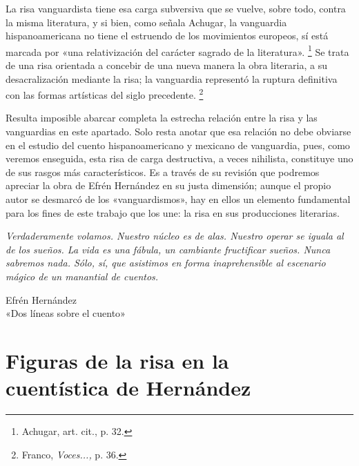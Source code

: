 \documentclass[14pt,twoside,final]{extbook} %
\let\oldfootnote\footnote
\renewcommand\footnote[1]{%
\oldfootnote{\hspace{1mm}#1}}
\begin{document}
La risa vanguardista tiene esa carga subversiva que se vuelve, sobre todo, contra la misma literatura, y si bien, como señala Achugar, la vanguardia hispanoamericana no tiene el estruendo de los movimientos europeos, sí está marcada por «una relativización del carácter sagrado de la literatura».\footnote{Achugar, art. cit., p. 32.} Se trata de una risa orientada a concebir de una nueva manera la obra literaria, a su desacralización mediante la risa; la vanguardia representó la ruptura definitiva con las formas artísticas del siglo precedente.\footnote{Franco, \emph{Voces...,} p. 36.}

Resulta imposible abarcar completa la estrecha relación entre la risa y las vanguardias en este apartado. Solo resta anotar que esa relación no debe obviarse en el estudio del cuento hispanoamericano y mexicano de vanguardia, pues, como veremos enseguida, esta risa de carga destructiva, a veces nihilista, constituye uno de sus rasgos más característicos. Es a través de su revisión que podremos apreciar la obra de Efrén Hernández en su justa dimensión; aunque el propio autor se desmarcó de los «vanguardismos», hay en ellos un elemento fundamental para los fines de este trabajo que los une: la risa en sus producciones literarias.
\cleardoublepage
\newpage
\pagestyle{empty}
\vspace*{42pt}
\begin{flushright}
\begin{minipage}{7.5cm} %
\emph{Verdaderamente volamos. Nuestro núcleo es de alas. Nuestro operar se iguala al de los sueños. La vida es una fábula, un cambiante fructificar sueños. Nunca sabremos nada. Sólo, sí, que asistimos en forma inaprehensible al escenario mágico de un manantial de cuentos.}
\begin{flushright}
Efrén Hernández \\ «Dos líneas sobre el cuento»
\end{flushright}
\end{minipage}
\end{flushright}
\chapter[\textsc{Figuras de la risa en la cuentística de Hernández}]{Figuras de la risa en la \\ cuentística de Hernández}\label{ch:figuras-de-la-risa-en-la-cuentistica-de-hernandez}
\BgThispage
\thispagestyle{empty}
\pagestyle{fancy}
\fancyhf{} %
\fancyhead[RO,LE]{\thepage}
\renewcommand{\headrulewidth}{0pt}
\end{document}
